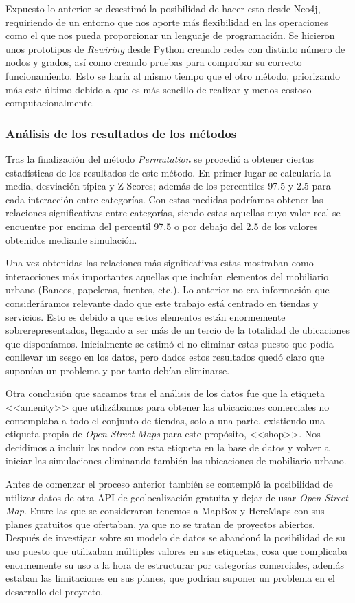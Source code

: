 Expuesto lo anterior se desestimó la posibilidad de hacer esto desde Neo4j, requiriendo de un entorno que nos aporte más flexibilidad en las operaciones como el que nos pueda proporcionar un lenguaje de programación. Se hicieron unos prototipos de \textit{Rewiring} desde Python creando redes con distinto número de nodos y grados, así como creando pruebas para comprobar su correcto funcionamiento. Esto se haría al mismo tiempo que el otro método, priorizando más este último debido a que es más sencillo de realizar y menos costoso computacionalmente.


\subsubsection{Análisis de los resultados de los métodos}
Tras la finalización del método \textit{Permutation} se procedió a obtener ciertas estadísticas de los resultados de este método. En primer lugar se calcularía la media, desviación típica y Z-Scores; además de los percentiles 97.5 y 2.5 para cada interacción entre categorías. Con estas medidas podríamos obtener las relaciones significativas entre categorías, siendo estas aquellas cuyo valor real se encuentre por encima del percentil 97.5 o por debajo del 2.5 de los valores obtenidos mediante simulación.

Una vez obtenidas las relaciones más significativas estas mostraban como interacciones más importantes aquellas que incluían elementos del mobiliario urbano (Bancos, papeleras, fuentes, etc.). Lo anterior no era información que consideráramos relevante dado que este trabajo está centrado en tiendas y servicios. Esto es debido a que estos elementos están enormemente sobrerepresentados, llegando a ser más de un tercio de la totalidad de ubicaciones que disponíamos. Inicialmente se estimó el no eliminar estas puesto que podía conllevar un sesgo en los datos, pero dados estos resultados quedó claro que suponían un problema y por tanto debían eliminarse.

Otra conclusión que sacamos tras el análisis de los datos fue que la etiqueta <<amenity>> que utilizábamos para obtener las ubicaciones comerciales no contemplaba
a todo el conjunto de tiendas, solo a una parte, existiendo una etiqueta propia de \textit{Open Street Maps} para este propósito, <<shop>>. Nos decidimos a incluir los nodos con esta etiqueta en la base de datos y volver a iniciar las simulaciones eliminando también las ubicaciones de mobiliario urbano.

Antes de comenzar el proceso anterior también se contempló la posibilidad de utilizar datos de otra API de geolocalización gratuita y dejar de usar \textit{Open Street Map}. Entre las que se consideraron tenemos a MapBox y HereMaps con sus planes gratuitos que ofertaban, ya que no se tratan de proyectos abiertos. Después de investigar sobre su modelo de datos se abandonó la posibilidad de su uso puesto que utilizaban múltiples valores en sus etiquetas, cosa que complicaba enormemente su uso a la hora de estructurar por categorías comerciales, además estaban las limitaciones en sus planes, que podrían suponer un problema en el desarrollo del proyecto.

